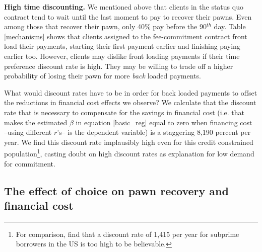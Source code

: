 \documentclass[oneside,11pt]{article}
\begin{document}
\vspace{.1in}
\noindent \textbf{High time discounting.} We mentioned above that clients in the status quo contract tend to wait until the last moment to pay to recover their pawns. Even among those that recover their pawn, only 40\% pay before the 90$^{th}$ day. Table \ref{mechanisms} shows that clients assigned to the fee-commitment contract front load their payments, starting their first payment earlier and finishing paying earlier too. However, clients may dislike front loading payments if their time preference discount rate is high. They may be willing to trade off a higher probability of losing their pawn for more \textit{back} loaded payments.  

What would discount rates have to be in order for back loaded payments to offset the reductions in financial cost effects we observe? %
We calculate that the discount rate that is necessary to compensate for the savings in financial cost (i.e. that makes the estimated $\beta$ in equation \ref{basic_reg} equal to zero when financing cost --using different $r$'s-- is the dependent variable) is a staggering 8,190 percent per year. We find this discount rate implausibly high even for this credit constrained population\footnote{For comparison, \cite{Levin} find that a discount rate of 1,415 per year for subprime borrowers in the US is too high to be believable.}, casting doubt on high discount rates as explanation for low demand for commitment. %


\vspace{.2in}
\subsection{The effect of choice on pawn recovery and financial cost} \label{effect_choice}
\end{document}
